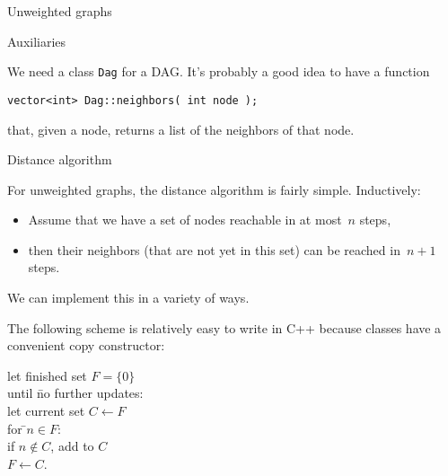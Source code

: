 
 {Unweighted graphs}

 {Auxiliaries}

We need a class \lstinline{Dag} for a \acf{DAG}.
It's probably a good idea to have a function
\begin{lstlisting}
vector<int> Dag::neighbors( int node );
\end{lstlisting}
that, given a node, returns a list of the neighbors of that node.

 {Distance algorithm}

For unweighted graphs, the distance algorithm is fairly simple.
Inductively:
\begin{itemize}
\item Assume that we have a set of nodes reachable in at most~$n$ steps,
\item then their neighbors (that are not yet in this set)
  can be reached in~$n+1$ steps.
\end{itemize}

We can implement this in a variety of ways.

The following scheme is relatively easy to write in C++
because classes have a convenient copy constructor:
\begin{tabbing}
  let finished set $F=\{0\}$\\
  until \=no further updates:\\
  \> let current set $C\leftarrow F$\\
  \> for \=$n\in F$:\\
  \>\>if $n\not\in C$, add to $C$\\
  \> $F\leftarrow C$.
\end{tabbing}


